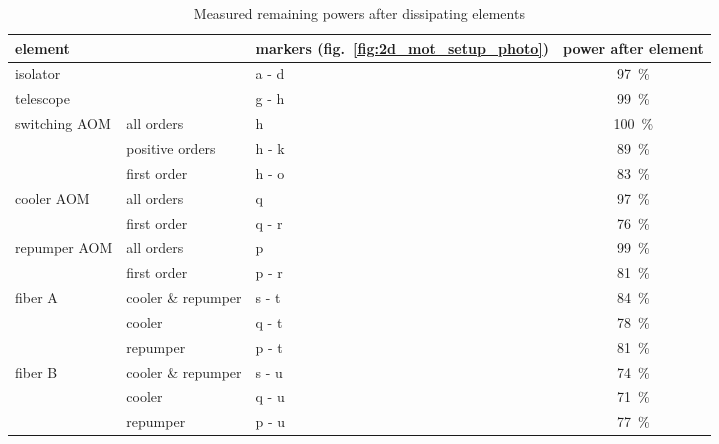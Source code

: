 \begin{table}
    \centering
    \begin{subtable}{\textwidth}
        \centering
        \begin{tabular}{lllc}
            \toprule
            \multicolumn{2}{l}{\textbf{element}} & \textbf{markers} (fig.~\ref{fig:2d_mot_setup_photo}) & \textbf{power after element} \\
            \toprule
            isolator & & a - d & \SI{97}{\percent} \\
            \midrule
            telescope & & g - h & \SI{99}{\percent} \\
            \midrule
            \multirow{3}{*}{switching AOM} & all orders & h & \SI{100}{\percent} \\ 
            & positive orders & h - k & \SI{89}{\percent} \\
            & first order & h - o & \SI{83}{\percent} \\
            \midrule
            \multirow{2}{*}{cooler AOM} & all orders & q & \SI{97}{\percent} \\
            & first order  & q - r & \SI{76}{\percent} \\
            \midrule
            \multirow{2}{*}{repumper AOM} & all orders & p & \SI{99}{\percent} \\
            & first order  & p - r & \SI{81}{\percent} \\
            \midrule
            \multirow{3}{*}{fiber A} & cooler \& repumper & s - t & \SI{84}{\percent} \\
            & cooler & q - t & \SI{78}{\percent} \\
            & repumper & p - t & \SI{81}{\percent} \\
            \midrule
            \multirow{3}{*}{fiber B} & cooler \& repumper & s - u & \SI{74}{\percent} \\
            & cooler & q - u & \SI{71}{\percent} \\
            & repumper & p - u & \SI{77}{\percent} \\
            \bottomrule
        \end{tabular}
        \caption{Measured remaining powers after dissipating elements}
        \label{tab:power_loss_table}
    \end{subtable}


\end{table}
